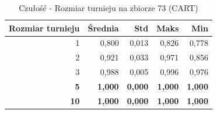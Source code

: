 \begin{table}[htbp]
\centering
\small
\setlength{\tabcolsep}{6pt}
\renewcommand{\arraystretch}{1.2}
\caption{Czułość - Rozmiar turnieju na zbiorze 73 (CART)}
\label{tab:CART_tournament_size_73_recall}
\begin{tabular}{r|r|r|r|r}
\toprule
Rozmiar turnieju & Średnia & Std & Maks & Min \\
\hline
1 & 0,800 & 0,013 & 0,826 & 0,778 \\
2 & 0,921 & 0,033 & 0,971 & 0,856 \\
3 & 0,988 & 0,005 & 0,996 & 0,976 \\
\textbf{5} & \textbf{1,000} & \textbf{0,000} & \textbf{1,000} & \textbf{1,000} \\
\textbf{10} & \textbf{1,000} & \textbf{0,000} & \textbf{1,000} & \textbf{1,000} \\
\bottomrule
\end{tabular}
\end{table}